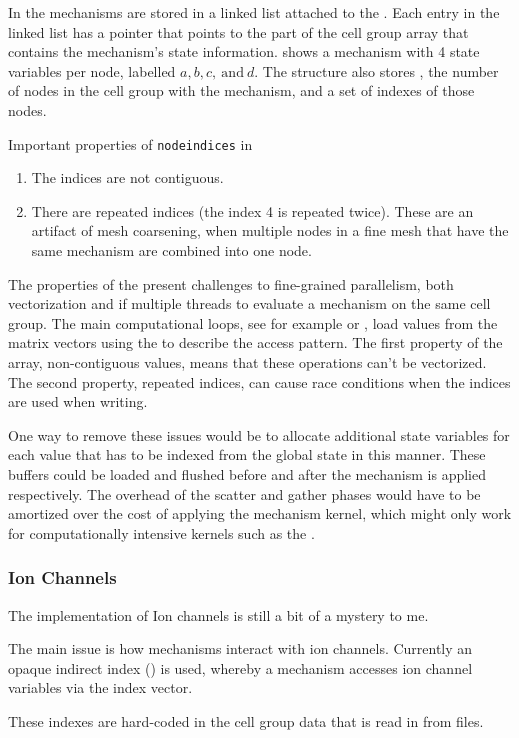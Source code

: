In \neuron the mechanisms are stored in a linked list attached to the .
Each entry in the linked list has a  pointer that points to the part of the cell group array that contains the mechanism's state information.
 shows a mechanism with 4 state variables per node, labelled $a,b,c,~\text{and}~d$.
The  structure also stores , the number of nodes in the cell group with the mechanism, and a set of indexes  of those nodes.

\begin{infobox}{Important properties of \texttt{nodeindices} in }
\begin{enumerate}[leftmargin=*]
\item
The indices are not contiguous.
\item
There are repeated indices (the index 4 is repeated twice). These are an artifact of mesh coarsening, when multiple nodes in a fine mesh that have the same mechanism are combined into one node.
\end{enumerate}
\end{infobox}

The properties of the  present challenges to fine-grained parallelism, both vectorization and if multiple threads to evaluate a mechanism on the same cell group.
The main computational loops, see for example  or , load values from the matrix vectors using the  to describe the access pattern.
The first property of the array, non-contiguous values, means that these operations can't be vectorized.
The second property, repeated indices, can cause race conditions when the indices are used when writing.

One way to remove these issues would be to allocate additional state variables for each value that has to be indexed from the global state in this manner.
These buffers could be loaded and flushed before and after the mechanism is applied respectively.
The overhead of the scatter and gather phases would have to be amortized over the cost of applying the mechanism kernel, which might only work for computationally intensive kernels such as the .
\subsubsection{Ion Channels}
\begin{todo}
The implementation of Ion channels is still a bit of a mystery to me.

The main issue is how mechanisms interact with ion channels. Currently an opaque indirect index () is used, whereby a mechanism accesses ion channel variables via the  index vector.

These indexes are hard-coded in the cell group data that is read in from  files.
\end{todo}
